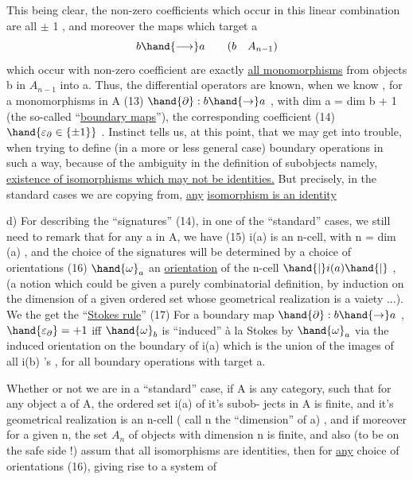 
This being  clear,  the non-zero coefficients which occur in this
linear combination are all $\pm$ 1 ,  and moreover the maps which target a
\[ b \hand{\longrightarrow} a \qquad (b \quad A_{n-1}) \]
which occur with non-zero coefficient are exactly \uline{all monomorphisms}
from objects b in $A_{n-1}$ into a.  Thus,  the differential operators are
known,  when we know ,  for a monomorphisms in A
(13) \qquad $\hand{\partial}: b \hand{\to} a$ \quad , \quad with \quad dim a = dim b + 1
(the so-called ``\uline{boundary maps}''),  the corresponding coefficient
(14) \qquad $\hand{\varepsilon_{\partial} \in \{\pm 1\}}$ .
Instinct tells us,  at this point,  that we may get into trouble,  when
trying to define (in a more or less general case)  boundary operations
in such a way,  because of the ambiguity in the definition of subobjects\hand{,}
namely,   \uline{existence of isomorphisms which may not be identities.}
But precisely,  in the standard cases we are  copying from,  \uline{any}
\uline{isomorphism is an identity}\hand{!}

d)  For describing the ``signatures'' (14),  in one of the ``standard''
cases,  we still need to remark that  for any a in A,  we have
(15) \qquad i(a)  is an n-cell,  with  n = dim (a) \quad ,
and the choice of the  signatures will be determined by a choice
of orientations
(16) \qquad $\hand{\omega}_a$ an \uline{orientation} of the n-cell $\hand{|}i(a)\hand{|}$ \quad ,
(a notion which could be given a purely combinatorial definition,  by
induction on the dimension of a given ordered set whose geometrical
realization is a vaiety ...).  We the get the ``\uline{Stokes rule}''
(17) \quad For a boundary map $\hand{\partial}: b \hand{\to} a$ \quad , $\hand{\varepsilon_{\partial}} = +1$  iff $\hand{\omega}_b$ is ``induced'' à
la Stokes by $\hand{\omega}_a$\hand{,} via the induced orientation on the boundary
of  i(a) \hand{(} which is the union of the images of all  i(b) 's ,
for all boundary operations with target a\hand{)}.

Whether or not we are in a ``standard'' case,  if A is any category,
such that for any object a of A,  the ordered set i(a)  of it's subob-%
jects in A  is finite,  and it's geometrical realization is an n-cell
( call n the ``dimension'' of a) ,  and if moreover for a given n,  the
set $A_n$ of objects with dimension n is finite,  and also (to be on the
safe side !)   assum that all isomorphisms are identities,  then
for \uline{any} choice  of orientations (16),  giving rise to a system of

